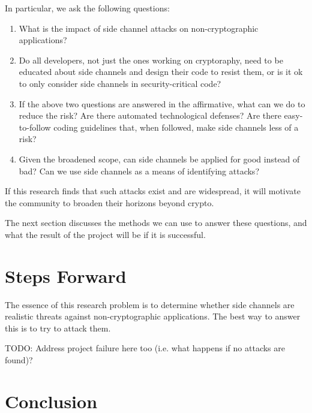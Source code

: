 \documentclass{acm_proc_article-sp}
\begin{document}
In particular, we ask the following questions:

\begin{enumerate}
\item What is the impact of side channel attacks on non-cryptographic
      applications?

\item Do all developers, not just the ones working on cryptoraphy, need to be
      educated about side channels and design their code to resist them, or is
      it ok to only consider side channels in security-critical code?

\item If the above two questions are answered in the affirmative, what can we do
      to reduce the risk? Are there automated technological defenses? Are there
      easy-to-follow coding guidelines that, when followed, make side channels
      less of a risk?

\item Given the broadened scope, can side channels be applied for good instead
      of bad? Can we use side channels as a means of identifying attacks?
\end{enumerate}

If this research finds that such attacks exist and are widespread, it will
motivate the community to broaden their horizons beyond crypto.

The next section discusses the methods we can use to answer these questions, and
what the result of the project will be if it is successful.

\section{Steps Forward}

% 
% 

The essence of this research problem is to determine whether side channels are
realistic threats against non-cryptographic applications. The best way to answer
this is to try to attack them.

TODO: Address project failure here too (i.e. what happens if no attacks are
found)?

\section{Conclusion}
\end{document}
